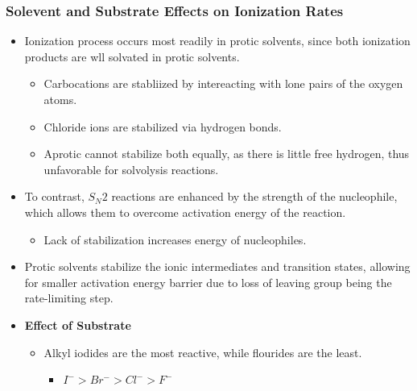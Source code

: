 \documentclass[12pt,a4paper]{article}
\begin{document}
\begin{itemize}
    \subsubsection{Solevent and Substrate Effects on Ionization Rates}
    \begin{itemize}
        \item Ionization process occurs most readily in {\color{o-Sun}protic solvents}, since both ionization products are wll solvated in protic solvents.
            \begin{itemize}
                \item Carbocations are stabliized by intereacting with lone pairs of the oxygen atoms.
                \item Chloride ions are stabilized via hydrogen bonds.
                \item Aprotic cannot stabilize both equally, as there is little free hydrogen, thus unfavorable for solvolysis reactions.
            \end{itemize}
        \item To contrast, \(S_N2\) reactions are enhanced by the {\color{o-Sun}strength of the nucleophile}, which allows them to overcome activation energy of the reaction.
            \begin{itemize}
                \item Lack of stabilization increases energy of nucleophiles.
            \end{itemize}
        \item Protic solvents stabilize the ionic intermediates and transition states, allowing for smaller activation energy barrier due to loss of leaving group being the rate-limiting step.
        \item \textbf{Effect of Substrate}
            \begin{itemize}
                \item Alkyl iodides are the most reactive, while flourides are the least.
                    \begin{itemize}
                        \item \(I^->Br^->Cl^->F^-\)
                    \end{itemize}
            \end{itemize}
    \end{itemize}
\end{itemize}
\end{document}
